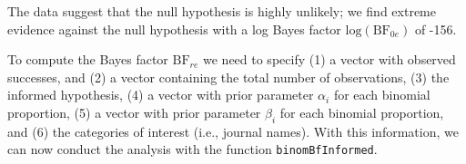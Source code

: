 \documentclass[
  english,
  man,floatsintext]{apa6}
\newenvironment{Shaded}{\begin{snugshade}}{\end{snugshade}}
\newcommand{\CommentTok}[1]{\textcolor[rgb]{0.56,0.35,0.01}{\textit{#1}}}
\newcommand{\DataTypeTok}[1]{\textcolor[rgb]{0.13,0.29,0.53}{#1}}
\newcommand{\DecValTok}[1]{\textcolor[rgb]{0.00,0.00,0.81}{#1}}
\newcommand{\KeywordTok}[1]{\textcolor[rgb]{0.13,0.29,0.53}{\textbf{#1}}}
\newcommand{\NormalTok}[1]{#1}
\newcommand{\OperatorTok}[1]{\textcolor[rgb]{0.81,0.36,0.00}{\textbf{#1}}}
\newcommand{\StringTok}[1]{\textcolor[rgb]{0.31,0.60,0.02}{#1}}
\begin{document}
\begin{Shaded}
\end{Shaded}

The data suggest that the null hypothesis is highly unlikely; we find extreme evidence against the null hypothesis with a log Bayes factor \(\text{log}(\text{BF}_{0e})\) of -156.

To compute the Bayes factor \(\text{BF}_{re}\) we need to specify (1) a vector with observed successes, and (2) a vector containing the total number of observations, (3) the informed hypothesis, (4) a vector with prior parameter \(\alpha_i\) for each binomial proportion, (5) a vector with prior parameter \(\beta_i\) for each binomial proportion, and (6) the categories of interest (i.e., journal names). With this information, we can now conduct the analysis with the function \texttt{binomBfInformed}.
\end{document}
